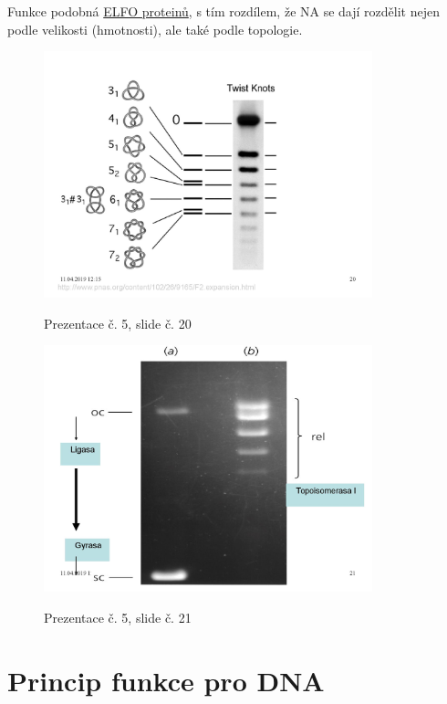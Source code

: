 \documentclass[DIV=8]{scrreprt}
\begin{document}
Funkce podobná \hyperref[Gelová elektroforéza]{ELFO proteinů}, s tím rozdílem, že NA se dají rozdělit nejen podle velikosti (hmotnosti), ale také podle topologie. \begin{figure}
    \caption{Prezentace č. 5, slide č. 20}
    \includegraphics[width=0.85\textwidth]{slides-5/slide-20.jpg}
    \centering
    \label{slides-5-slide-20}
\end{figure}
\begin{figure}
    \caption{Prezentace č. 5, slide č. 21}
    \includegraphics[width=0.85\textwidth]{slides-5/slide-21.jpg}
    \centering
    \label{slides-5-slide-21}
\end{figure}


\section{Princip funkce pro DNA} \label{Princip funkce pro DNA} \FloatBarrier
\end{document}
